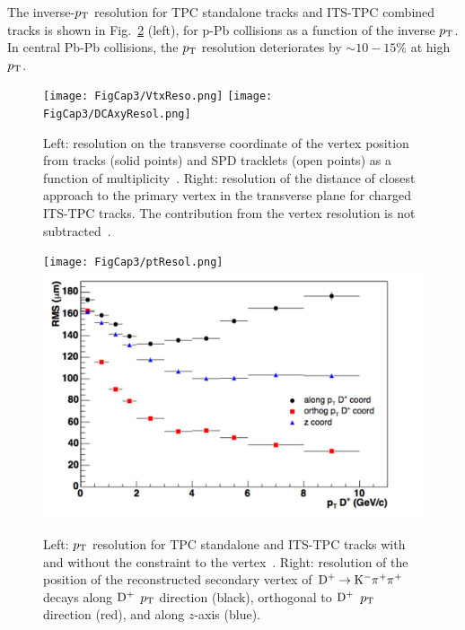\begin{itemize}
The inverse-$p_{\rm T}$ resolution for TPC standalone tracks and ITS-TPC combined tracks 
is shown in Fig.~\ref{fig:PtResolAndSecVtxResol} (left), for p-Pb collisions as a function of the inverse $p_{\rm T}$.
In central Pb-Pb collisions, the $p_{\rm T}$ resolution deteriorates by $\sim 10-15\%$ at high $p_{\rm T}$.
\begin{figure}[!h]
\centering
\texttt{[image: FigCap3/VtxReso.png]}
\texttt{[image: FigCap3/DCAxyResol.png]}
\caption{Left: resolution on the transverse coordinate of the vertex position from tracks (solid points) and SPD tracklets (open points) as a function of multiplicity~\cite{Abelev:2014ffa}. Right: resolution of the distance of closest approach to the primary vertex in the transverse plane for charged ITS-TPC tracks. The contribution from the vertex resolution is not subtracted~\cite{Abelev:2014ffa}. }
\label{fig:VtxResolDCAResol}
\end{figure}
\end{itemize}
\begin{figure}[!h]
\centering
\texttt{[image: FigCap3/ptResol.png]}
\includegraphics[width=.49\textwidth]{FigCap3/vertexSec.pdf}
\caption{Left: $p_{\rm T}$ resolution for TPC standalone and ITS-TPC tracks with and without the constraint to the vertex~\cite{Abelev:2014ffa}. Right: resolution of the position of the reconstructed secondary vertex of ${\rm D}^+\to {\rm K}^-\pi^+\pi^+$ decays along ${\rm D^+}$ $p_{\rm T}$ direction (black), 
orthogonal to ${\rm D^+}$ $p_{\rm T}$ direction (red), and along $z$-axis (blue).}
\label{fig:PtResolAndSecVtxResol}
\end{figure}

